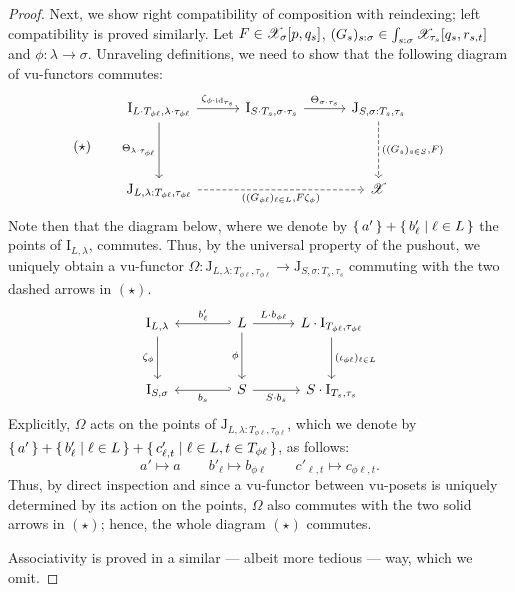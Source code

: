 \begin{proof}
    Next, we show right compatibility of composition with reindexing; left compatibility is proved similarly. Let $F \in \mathscr{X}_\sigma[p, q_s]$, $(G_s)_{s:\sigma} \in \int_{s:\sigma} \mathscr{X}_{\tau_s}[q_s, r_{s,t}]$ and $\phi \colon \lambda \to \sigma$. Unraveling definitions, we need to show that the following diagram of vu-functors commutes:
\[(\star) \qquad \begin{tikzcd}[column sep = 30pt, row sep =20pt]
	{\mathrm I_{L\cdot T_{\phi \ell}, \lambda \cdot \tau_{\phi \ell}}} & {\mathrm I_{S\cdot T_s, \sigma\cdot\tau_s}} & {\mathrm J_{S,\sigma:T_s,\tau_s}} \\
	\\
	{\mathrm J_{L,\lambda:T_{\phi \ell},\tau_{\phi \ell}}} && \X
	\arrow["{\zeta_{\phi\cdot \operatorname{id}_{\tau_s}}}", from=1-1, to=1-2]
	\arrow["{\Theta_{\lambda\cdot \tau_{\phi \ell}}}"', from=1-1, to=3-1]
	\arrow["{\Theta_{\sigma\cdot \tau_s}}", from=1-2, to=1-3]
	\arrow["{((G_s)_{s\in S}, F)}", dashed, from=1-3, to=3-3]
	\arrow["{((G_{\phi \ell})_{\ell\in L}, F\zeta_\phi )}"', dashed, from=3-1, to=3-3]
\end{tikzcd}\]
Note then that the diagram below, where we denote by $\set{ a' } + \set{ b'_\ell | \ell \in L}$ the points of $\mathrm I_{L,\lambda}$, commutes. Thus, by the universal property of the pushout, we uniquely obtain a vu-functor $\Omega \colon \mathrm J_{L,\lambda:T_{\phi \ell},\tau_{\phi \ell}} \to \mathrm J_{S,\sigma:T_s,\tau_s}$ commuting with the two dashed arrows in $(\star)$.
\[\begin{tikzcd}[column sep = 30pt, row sep =15pt]
	{\mathrm I_{L,\lambda}} &[10pt] L & {L\cdot\mathrm I_{T_{\phi \ell},\tau_{\phi \ell}}} \\
	\\
	{\mathrm I_{S,\sigma}} & {S } & {S\cdot\mathrm I_{T_s,\tau_s}}
	\arrow["{\zeta_\phi}"', from=1-1, to=3-1]
	\arrow["{b'_\ell}"', hook', from=1-2, to=1-1]
	\arrow["{L\cdot b_{\phi \ell}}", from=1-2, to=1-3]
	\arrow["\phi"', from=1-2, to=3-2]
	\arrow["{(\iota_{\phi \ell})_{\ell \in L}}", from=1-3, to=3-3]
	\arrow["{b_s}", hook', from=3-2, to=3-1]
	\arrow["{S\cdot b_s}"', from=3-2, to=3-3]
\end{tikzcd}\]
Explicitly, $\Omega$ acts on the points of $\mathrm J_{L,\lambda:T_{\phi \ell},\tau_{\phi \ell}}$, which we denote by $\set{ a' } + \set{ b'_\ell | \ell \in L} + \set{ c'_{\ell, t} | \ell\in L, t \in T_{\phi \ell}}$, as follows:
\[ a' \mapsto a \qquad b'_\ell \mapsto b_{\phi \ell} \qquad c'_{\ell, t} \mapsto c_{\phi \ell, t}.\]
Thus, by direct inspection and since a vu-functor between vu-posets is uniquely determined by its action on the points, $\Omega$ also commutes with the two solid arrows in $(\star)$; hence, the whole diagram $(\star)$ commutes.

Associativity is proved in a similar --- albeit more tedious --- way, which we omit.
\end{proof}

